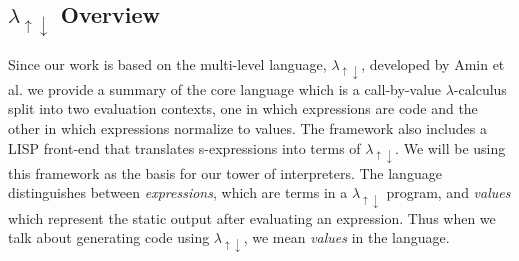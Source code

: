 \documentclass[a4paper,12pt,twoside,openright]{report}
\theoremstyle{definition}
\newcommand{\mslang}{$\lambda_{\uparrow\downarrow}$}
\begin{document}
%

\subsection{\texorpdfstring{\mslang}{Lg} Overview}\label{subsec:mslang}
Since our work is based on the multi-level language, \mslang, developed by Amin et al. \cite{amin2017collapsing} we provide a summary of the core language which is a call-by-value $\lambda$-calculus split into two evaluation contexts, one in which expressions are code and the other in which expressions normalize to values. The framework also includes a LISP front-end that translates s-expressions into terms of \mslang. We will be using this framework as the basis for our tower of interpreters. The language distinguishes between \textit{expressions}, which are terms in a \mslang{} program, and \textit{values} which represent the static output after evaluating an expression. Thus when we talk about generating code using \mslang{}, we mean \textit{values} in the language.
\end{document}
